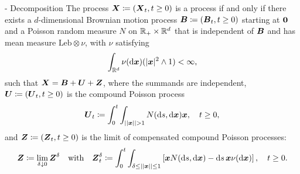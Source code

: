 \begin{thm}{\Levy{}-\Ito{} Decomposition}{}
	The process \(\boldsymbol{X} \coloneqq (\boldsymbol{X}_t, t \ge 0)\) is a \Levy{} process if and only if there exists a \(d\)-dimensional Brownian motion process \(\boldsymbol{B} \coloneqq (\boldsymbol{B}_t, t \ge 0)\) starting at \(\boldsymbol{0}\) and a Poisson random measure \(N\) on \(\mathbb{R}_+ \times \mathbb{R}^d\) that is independent of \(\boldsymbol{B}\) and has mean measure \(\text{Leb} \otimes \nu\), with \(\nu\) satisfying
	\begin{equation}
		\int_{\mathbb{R}^d} \nu(\mathrm{d} \boldsymbol{x}) (|\boldsymbol{x}|^2 \wedge 1) < \infty,
		\label{eq:LevyMeasureCondition}
	\end{equation}
	such that \(\boldsymbol{X} = \boldsymbol{B} + \boldsymbol{U} + \boldsymbol{Z}\), where the summands are independent, \(\boldsymbol{U} \coloneqq (\boldsymbol{U}_t, t \ge 0)\) is the compound Poisson process
	\begin{equation*}
		\boldsymbol{U}_t \coloneqq \int_0^t \int_{||\boldsymbol{x}|| > 1} N(\mathrm{d} s, \mathrm{d} \boldsymbol{x}) \boldsymbol{x}, \quad t \ge 0,
	\end{equation*}
	and \(\boldsymbol{Z} \coloneqq (\boldsymbol{Z}_t, t \ge 0)\) is the limit of compensated compound Poisson processes:
	\begin{equation*}
		\boldsymbol{Z} \coloneqq \lim_{\delta \downarrow 0} \boldsymbol{Z}^{\delta} \quad \text{with} \quad \boldsymbol{Z}^{\delta}_t \coloneqq \int_0^t \int_{\delta \le ||\boldsymbol{x}|| \le 1} \left[\boldsymbol{x} N(\mathrm{d} s, \mathrm{d} \boldsymbol{x}) - \mathrm{d} s \, \boldsymbol{x} \nu(\mathrm{d} \boldsymbol{x})\right], \quad t \ge 0.
	\end{equation*}
\end{thm}
